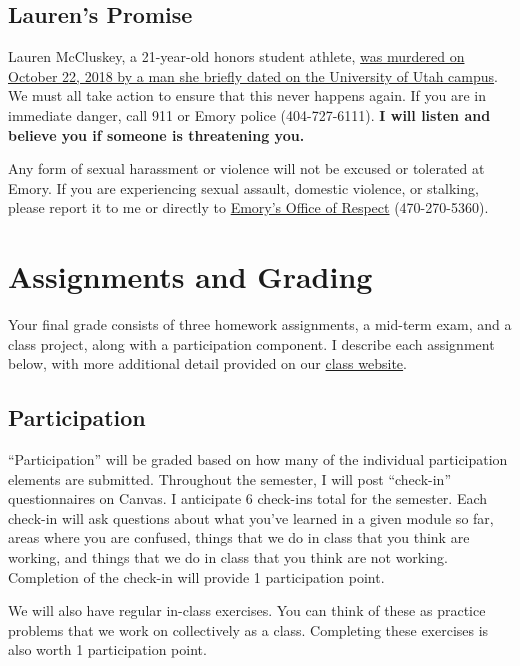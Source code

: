 \documentclass[11pt,]{article}
\begin{document}
\hypertarget{laurens-promise}{%
\subsection{Lauren's Promise}\label{laurens-promise}}

Lauren McCluskey, a 21-year-old honors student athlete,
\href{https://www.sltrib.com/opinion/commentary/2019/02/10/commentary-failing-lauren/}{was
murdered on October 22, 2018 by a man she briefly dated on the
University of Utah campus}. We must all take action to ensure that this
never happens again. If you are in immediate danger, call 911 or Emory
police (404-727-6111). \textbf{I will listen and believe you if someone
is threatening you.}

Any form of sexual harassment or violence will not be excused or
tolerated at Emory. If you are experiencing sexual assault, domestic
violence, or stalking, please report it to me or directly to
\href{http://respect.emory.edu/index.html}{Emory's Office of Respect}
(470-270-5360).

\hypertarget{assignments-and-grading}{%
\section{Assignments and Grading}\label{assignments-and-grading}}

Your final grade consists of three homework assignments, a mid-term
exam, and a class project, along with a participation component. I
describe each assignment below, with more additional detail provided on
our \href{https://econ372s23.classes.ianmccarthyecon.com/}{class
website}.

\hypertarget{participation}{%
\subsection{Participation}\label{participation}}

``Participation'' will be graded based on how many of the individual
participation elements are submitted. Throughout the semester, I will
post ``check-in'' questionnaires on Canvas. I anticipate 6 check-ins
total for the semester. Each check-in will ask questions about what
you've learned in a given module so far, areas where you are confused,
things that we do in class that you think are working, and things that
we do in class that you think are not working. Completion of the
check-in will provide 1 participation point.

We will also have regular in-class exercises. You can think of these as
practice problems that we work on collectively as a class. Completing
these exercises is also worth 1 participation point.
\end{document}

